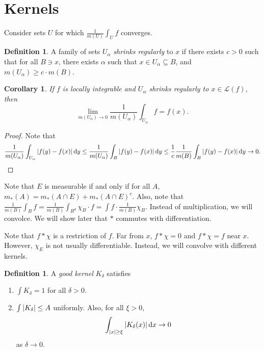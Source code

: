 \documentclass[leqno, openany]{memoir}
\newtheorem{cor}[thm]{Corollary}
\theoremstyle{definition}
\newtheorem{defn}[thm]{Definition}
\theoremstyle{remark}
\theoremstyle{plain}
\theoremstyle{definition}
\theoremstyle{remark}
\newcommand{\mc}[1]{\mathcal{#1}}
\begin{document}
\section{Kernels}%
\label{sec:kernels}

Consider sets $U$ for which $\frac{1}{m(U)} \int_U f$ converges.

\begin{defn}
    A family of sets $U_{\alpha}$ \textit{shrinks regularly} to $x$ if there exists $c > 0$ such that for all $B \ni x$, there exists $\alpha$ such that $x \in U_{\alpha} \subseteq B$, and $m(U_{\alpha}) \geq c \cdot m(B)$.
\end{defn}

\begin{cor}
    If $f$ is locally integrable and $U_{\alpha}$ shrinks regularly to $x \in \mc{L}(f)$, then
    \[ \lim_{m(U_{\alpha}) \to 0} \frac{1}{m(U_{\alpha})} \int_{U_{\alpha}} f = f(x). \]
\end{cor}

\begin{proof}
    Note that
    \[ \frac{1}{m(U_{\alpha})} \int_{U_{\alpha}} \abs{f(y) - f(x)} \dd{y} \leq \frac{1}{m(U_{\alpha})} \int_B \abs{f(y) - f(x)} \dd{y} \leq \frac{1}{c} \frac{1}{m(B)} \int_B \abs{f(y) - f(x)} \dd{y} \to 0. \qedhere \]
\end{proof}

Note that $E$ is measurable if and only if for all $A$, $m_*(A) = m_*(A \cap E) + m_*(A \cap E)^c$. Also, note that $\frac{1}{m(B)} \int_B f = \frac{1}{m(B)} \int_{R^d} \chi_B \cdot f = \int f \cdot \frac{1}{m(B)} \chi_B$. Instead of multiplication, we will convolce. We will show later that $*$ commutes with differentiation.

Note that $f * \chi$ is a restriction of $f$. Far from $x$, $f * \chi = 0$ and $f * \chi = f$ near $x$. However, $\chi_E$ is not usually differentiable. Instead, we will convolve with different kernels.

\begin{defn}
    A \textit{good kernel} $K_{\delta}$ satisfies
    \begin{enumerate}
        \item $\int K_{\delta} = 1$ for all $\delta > 0$.
        \item $\int \abs{K_{\delta}} \leq A$ uniformly. Also, for all $\xi > 0$, 
            \[ \int_{\abs{x} \geq \xi} \abs{K_{\delta}(x)} \dd{x} \to 0 \]
            as $\delta \to 0$.
    \end{enumerate}
\end{defn}
\end{document}
